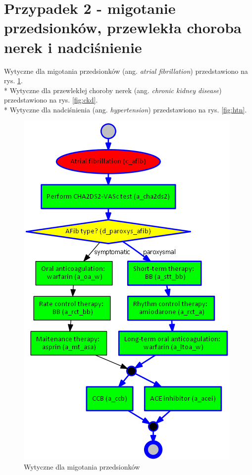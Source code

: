 \section{Przypadek 2 - migotanie przedsionków, przewlekła choroba nerek i nadciśnienie}
Wytyczne dla migotania przedsionków (ang. \textit{atrial fibrillation}) przedstawiono na rys. \ref{fig:afib}.\\*
Wytyczne dla przewlekłej choroby nerek (ang. \textit{chronic kidney disease}) przedstawiono na rys. \ref{fig:ckd}.\\*
Wytyczne dla nadciśnienia (ang. \textit{hypertension}) przedstawiono na rys. \ref{fig:htn}.
\begin{figure}[H]
\centering
\includegraphics[scale=0.5]{img/afib-ver-4.png}
\caption{Wytyczne dla migotania przedsionków}
\label{fig:afib}
\end{figure}
\newpage
